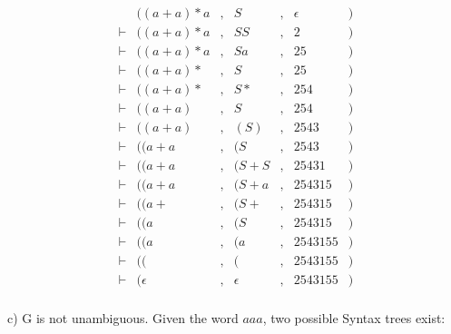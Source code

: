 \begin{equation*}
  \begin{aligned}
          & ((a + a)*a&, &S&, &\epsilon &) \\
 \vdash   & ((a + a)*a&,  &SS&, &2 &) \\
 \vdash   & ((a + a)*a&,  &Sa&, &25 &) \\
 \vdash   & ((a + a)*&,  &S&, &25 &) \\
 \vdash   & ((a + a)*&,  &S*&, &254 &) \\
 \vdash   & ((a + a)&,  &S&, &254 &) \\
 \vdash   & ((a + a)&,  &(S)&, &2543 &) \\
 \vdash   & ((a + a&,  &(S&, &2543 &) \\
 \vdash   & ((a + a&,  &(S+S&, &25431 &) \\
 \vdash   & ((a + a&,  &(S+a&, &254315 &) \\
 \vdash   & ((a +&,  &(S+&, &254315 &) \\
 \vdash   & ((a&,  &(S&, &254315 &) \\
 \vdash   & ((a&,  &(a&, &2543155 &) \\
 \vdash   & ((&,  &(&, &2543155 &) \\
 \vdash   & (\epsilon&,  & \epsilon&, &2543155&) \\
\end{aligned}
\end{equation*}

c) G is not unambiguous. Given the word $aaa$, two possible Syntax trees exist:

